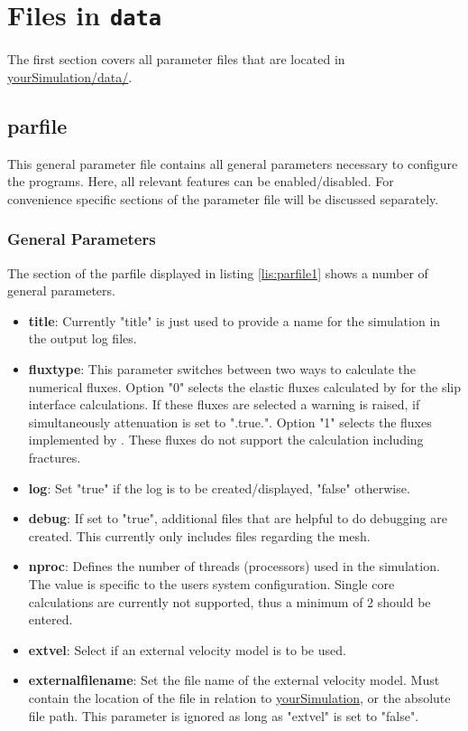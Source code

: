 	\section{Files in \texttt{data}}
		The first section covers all parameter files that are located in \url{yourSimulation/data/}.
		
	\subsection{parfile}
	\label{subsec:parfile}
		This general parameter file contains all general parameters necessary to configure the programs. Here, all relevant features can be enabled/disabled. For convenience specific sections of the parameter file will be discussed separately.
		\subsubsection{General Parameters}
		\label{subsec:genpar}
			
			The section of the parfile displayed in listing \ref{lis:parfile1} shows a number of general parameters. 	
			\begin{itemize}
				\item \textbf{title}: Currently "title" is just used to provide a name for the simulation in the output log files.
				\item \textbf{fluxtype}: This parameter switches between two ways to calculate the numerical fluxes. Option "0" selects the elastic fluxes calculated by \cite{moeller.2018} for the slip interface calculations. If these fluxes are selected a warning is raised, if simultaneously attenuation is set to ".true.". Option "1" selects the fluxes implemented by \citep{Lambrecht.2015}. These fluxes do not support the calculation including fractures.
				\item \textbf{log}: Set "true" if the log is to be created/displayed, "false" otherwise.
				\item \textbf{debug}: If set to "true", additional files that are helpful to do debugging are created. This currently only includes files regarding the mesh.
				\item \textbf{nproc}: Defines the number of threads (processors) used in the simulation. The value is specific to the users system configuration. Single core calculations are currently not supported, thus a minimum of 2 should be entered.
				\item \textbf{extvel}: Select if an external velocity model is to be used.
				\item \textbf{externalfilename}: Set the file name of the external velocity model. Must contain the location of the file in relation to \url{yourSimulation}, or the absolute file path. This parameter is ignored as long as "extvel" is set to "false". 
			\end{itemize}
